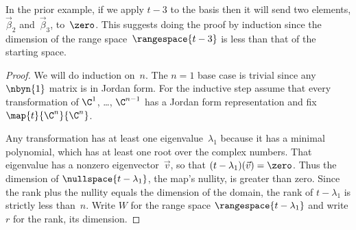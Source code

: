 In the prior example, if we apply
$t-3$ to the basis then it will send two elements, 
$\vec{\beta}_2$ and~$\vec{\beta}_3$, to~$\zero$.
This suggests doing the proof by induction 
since the dimension of the range space~$\rangespace{t-3}$
is less than that of the starting space.

\begin{proof}
%
We will do induction on~$n$.
The $n=1$ base case is trivial since any $\nbyn{1}$ matrix is in Jordan form.
For the inductive step assume that 
every transformation of $\C^1$, \ldots, $\C^{n-1}$ has a Jordan form
representation
and fix $\map{t}{\C^n}{\C^n}$.

Any transformation has at least one eigenvalue~$\lambda_1$ because
it has a minimal polynomial, which
has at least one root over the complex numbers.
That eigenvalue has a nonzero 
eigenvector~$\vec{v}$, so that $(t-\lambda_1)(\vec{v})=\zero$.
Thus the dimension of $\nullspace{t-\lambda_1}$, the map's nullity,
is greater than zero.
Since the rank plus the nullity equals the dimension of the domain,
the rank of $t-\lambda_1$
is strictly less than~$n$.
Write $W$ for the range space $\rangespace{t-\lambda_1}$ and write
$r$ for the rank, its dimension.


\end{proof}
